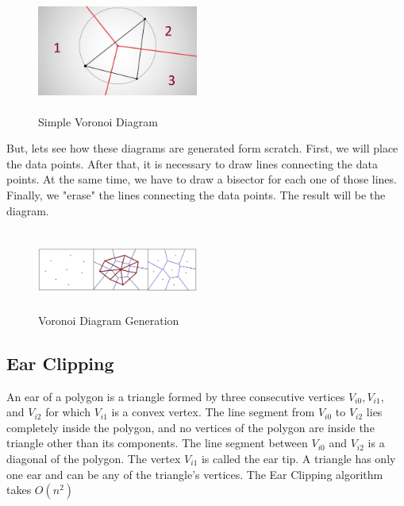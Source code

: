 \documentclass[conference]{IEEEtran}
\begin{document}
\begin{figure}[H]
    \centering
    \includegraphics[width=200,height=150,keepaspectratio]{maxresdefault2.jpg}
    \caption{Simple Voronoi Diagram}
    \label{fig:VoronoiDiagram1}
\end{figure}

But, lets see how these diagrams are generated form scratch. First, we will place the data points. After that, it is necessary to draw lines connecting the data points. At the same time, we have to draw a bisector for each one of those lines. Finally, we "erase" the lines connecting the data points. The result will be the diagram.

\begin{figure}[H]
    \centering
    \includegraphics[width=200,height=100,keepaspectratio]{DiagramGeneration.jpg}
    \caption{Voronoi Diagram Generation}
    \label{fig:VoronoiDiagram1}
\end{figure}
    
\subsection{Ear Clipping}
An ear of a polygon is a triangle formed by three consecutive vertices $V_{i0},V_{i1},$ and $V_{i2}$ for which $V_{i1}$ is a convex vertex. The line segment from $V_{i0}$ to $V_{i2}$ lies completely inside the polygon, and no vertices of the polygon are inside the triangle other than its components. The line segment between $V_{i0}$ and $V_{i2}$ is a diagonal of the polygon. The vertex $V_{i1}$ is called the ear tip. A triangle has only one ear and can be any of the triangle's vertices. The Ear Clipping algorithm takes $O(n^2)$\cite{EarClipping}
\end{document}
